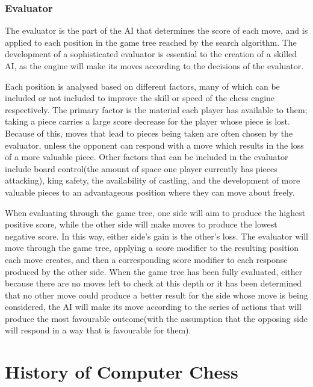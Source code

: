 \documentclass{l3proj}
\begin{document}
\subsubsection{Evaluator}

	The evaluator is the part of the AI that determines the score of each move, and is applied to each position in the game tree reached by the search algorithm. The development of a sophisticated evaluator is essential to the creation of a skilled AI, as the engine will make its moves according to the decisions of the evaluator.

	Each position is analysed based on different factors, many of which can be included or not included to improve the skill or speed of the chess engine respectively. The primary factor is the material each player has available to them; taking a piece carries a large score decrease for the player whose piece is lost. Because of this, moves that lead to pieces being taken are often chosen by the evaluator, unless the opponent can respond with a move which results in the loss of a more valuable piece.  Other factors that can be included in the evaluator include board control(the amount of space one player currently has pieces attacking), king safety, the availability of castling, and the development of more valuable pieces to an advantageous position where they can move about freely.

When evaluating through the game tree, one side will aim to produce the highest positive score, while the other side will make moves to produce the lowest negative score. In this way, either side's gain is the other's loss. The evaluator will move through the game tree, applying a score modifier to the resulting position each move creates, and then a corresponding score modifier to each response produced by the other side. When the game tree has been fully evaluated, either because there are no moves left to check at this depth or it has been determined that no other move could produce a better result for the side whose move is being considered, the AI will make its move according to the series of actions that will produce the most favourable outcome(with the assumption that the opposing side will respond in a way that is favourable for them).

\section{History of Computer Chess}
\end{document}
